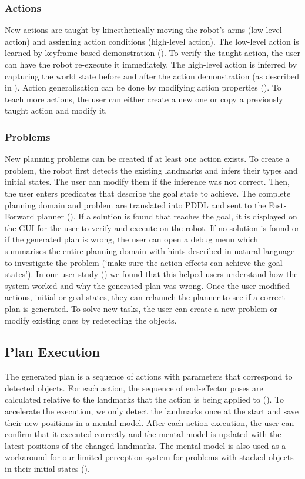 \subsubsection{Actions} New actions are taught by kinesthetically moving the robot's arms (low-level action) and assigning action conditions (high-level action).
The low-level action is learned %
by keyframe-based demonstration ().
To verify the taught action, the user can have the robot re-execute it immediately.
The high-level action is inferred by capturing the world state before and after the action demonstration (as described in ).
Action generalisation can be done by modifying action properties ().
To teach more actions, the user can either create a new one or copy a previously taught action and modify it.
\subsubsection{Problems} New planning problems can be created if at least one action exists.
To create a problem, the robot first detects the existing landmarks and infers their types and initial states.
The user can modify them if the inference was not correct.
Then, the user enters predicates that describe the goal state to achieve.
The complete planning domain and problem are translated into PDDL and sent to the Fast-Forward planner (\cite{hoffmann2001ff}).
If a solution is found that reaches the goal, it is displayed on the GUI for the user to verify and execute on the robot.
If no solution is found or if the generated plan is wrong, the user can open a debug menu which summarises the entire planning domain with hints described in natural language to investigate the problem (\eg `make sure the action effects can achieve the goal states').
In our user study () we found that this helped users understand how the system worked and why the generated plan was wrong.
Once the user modified actions, initial or goal states, they can relaunch the planner to see if a correct plan is generated.
To solve new tasks, the user can create a new problem or modify existing ones by redetecting the objects.


\subsection{Plan Execution} 
The generated plan is a sequence of actions with parameters that correspond to detected objects.
For each action, the sequence of end-effector poses are calculated relative to the landmarks that the action is being applied to ().
To accelerate the execution, we only detect the landmarks once at the start and save their new positions in a mental model.
After each action execution, the user can confirm that it executed correctly and the mental model is updated with the latest positions of the changed landmarks.
The mental model is also used as a workaround for our limited perception system for problems with stacked objects in their initial states ().

